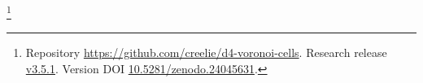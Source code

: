 \thanks{Repository \url{https://github.com/creelie/d4-voronoi-cells}. Research release \href{https://github.com/creelie/d4-voronoi-cells/releases/tag/v3.5.1}{v3.5.1}. Version DOI \href{https://doi.org/10.5281/zenodo.24045631}{10.5281/zenodo.24045631}.}
